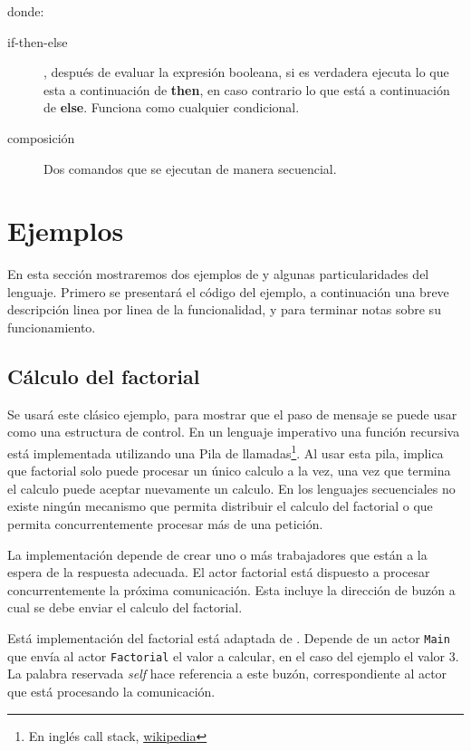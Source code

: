 donde:

\begin{description}
\item [if-then-else], después de evaluar la expresión booleana, si es verdadera
  ejecuta lo que esta a continuación de \textbf{then}, en caso contrario lo que está a
  continuación de \textbf{else}. Funciona como cualquier condicional.
\item [composición] Dos comandos que se ejecutan de manera secuencial.

\end{description}

\section{Ejemplos}

En esta sección mostraremos dos ejemplos de \SAL y algunas particularidades del lenguaje. Primero se presentará el código del ejemplo, a continuación una breve descripción linea por linea de la funcionalidad, y para terminar notas sobre su funcionamiento.

\subsection{Cálculo del factorial}\label{sal:factorial}

Se usará este clásico ejemplo, para mostrar que el paso de mensaje se puede usar como una estructura de control. En un lenguaje imperativo una función recursiva está implementada utilizando una Pila de llamadas\footnote{En inglés call stack, \href{https://es.wikipedia.org/wiki/Pila_de_llamadas}{wikipedia}}. Al usar esta pila, implica que factorial solo puede procesar un único calculo a la vez, una vez que termina el calculo puede aceptar nuevamente un calculo. En los lenguajes secuenciales no existe ningún mecanismo que permita distribuir el calculo del factorial o que permita concurrentemente procesar más de una petición.

La implementación depende de crear uno o más trabajadores que están a la espera de la respuesta adecuada. El actor factorial está dispuesto a procesar concurrentemente la próxima comunicación. Esta incluye la dirección de buzón a cual se debe enviar el calculo del factorial.

Está implementación del factorial está adaptada de \cite{Agha:1986:AMC:7929}. Depende de un actor \lstinline[language=sal, style=simple]$Main$ que envía al actor \lstinline[language=sal, style=simple]$Factorial$ el valor a calcular, en el caso del ejemplo el valor $3$. La palabra reservada \textit{self} hace referencia a este buzón, correspondiente al actor que está procesando la comunicación.

